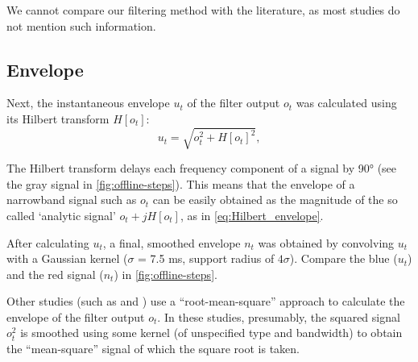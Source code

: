 We cannot compare our filtering method with the literature, as most studies do not mention such information.



\subsection{Envelope}

Next, the instantaneous envelope $u_t$ of the filter output $o_t$ was calculated using its Hilbert transform\footnotemark{} $H[o_t]$:
%
\begin{equation}
\label{eq:Hilbert_envelope}
u_t = \sqrt{o_t^2 + H[o_t]^2},
\end{equation}


The Hilbert transform delays each frequency component of a signal by 90\si{\degree} \cite{Lyons2010} (see the gray signal in \cref{fig:offline-steps}). This means that the envelope of a narrowband signal such as $o_t$ can be easily obtained as the magnitude of the so called `analytic signal' $o_t + j H[o_t]$, as in \cref{eq:Hilbert_envelope}.\footnotemark{}


After calculating $u_t$, a final, smoothed envelope $n_t$ was obtained by convolving $u_t$ with a Gaussian kernel ($\sigma$ = 7.5 ms, support radius of $4 \sigma$). Compare the blue ($u_t$) and the red signal ($n_t$) in \cref{fig:offline-steps}.

Other studies (such as \cite{Nadasdy1999} and \cite{Csicsvari2000}) use a ``root-mean-square'' approach to calculate the envelope of the filter output $o_t$. In these studies, presumably, the squared signal $o_t^2$ is smoothed using some kernel (of unspecified type and bandwidth) to obtain the ``mean-square'' signal of which the square root is taken.



